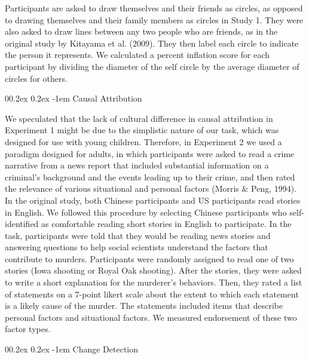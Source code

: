\documentclass[
  man]{apa6}
\makeatletter
\let\oldparagraph\paragraph
\renewcommand{\paragraph}[1]{\oldparagraph{#1}\mbox{}}
\renewcommand{\paragraph}{\@startsection{paragraph}{4}{\parindent}%
  {0\baselineskip \@plus 0.2ex \@minus 0.2ex}%
  {-1em}%
  {\normalfont\normalsize\bfseries\itshape\typesectitle}}
\makeatother
\begin{document}
Participants are asked to draw themselves and their friends as circles, as opposed to drawing themselves and their family members as circles in Study 1. They were also asked to draw lines between any two people who are friends, as in the original study by Kitayama et al. (2009). They then label each circle to indicate the person it represents. We calculated a percent inflation score for each participant by dividing the diameter of the self circle by the average diameter of circles for others.

\hypertarget{causal-attribution-2}{%
\paragraph{Causal Attribution}\label{causal-attribution-2}}

We speculated that the lack of cultural difference in causal attribution in Experiment 1 might be due to the simplistic nature of our task, which was designed for use with young children. Therefore, in Experiment 2 we used a paradigm designed for adults, in which participants were asked to read a crime narrative from a news report that included substantial information on a criminal's background and the events leading up to their crime, and then rated the relevance of various situational and personal factors (Morris \& Peng, 1994). In the original study, both Chinese participants and US participants read stories in English. We followed this procedure by selecting Chinese participants who self-identified as comfortable reading short stories in English to participate. In the task, participants were told that they would be reading news stories and answering questions to help social scientists understand the factors that contribute to murders. Participants were randomly assigned to read one of two stories (Iowa shooting or Royal Oak shooting). After the stories, they were asked to write a short explanation for the murderer's behaviors. Then, they rated a list of statements on a 7-point likert scale about the extent to which each statement is a likely cause of the murder. The statements included items that describe personal factors and situational factors. We measured endorsement of these two factor types.

\hypertarget{change-detection}{%
\paragraph{Change Detection}\label{change-detection}}
\end{document}
